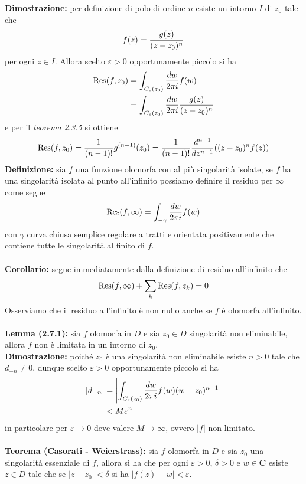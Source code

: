 \documentclass{article}
\begin{document}
\textbf{Dimostrazione:} per definizione di polo di ordine $n$ esiste un intorno $I$ di $z_0$ tale che
\begin{gather}
    f(z) = \frac{g(z)}{(z - z_0)^n} \notag
\end{gather}
per ogni $z \in I$. Allora scelto $\varepsilon > 0$ opportunamente piccolo si ha
\begin{align}
    \mathrm{Res}(f, z_0) &= \int_{C_\varepsilon(z_0)}\frac{dw}{2\pi i}f(w) \notag \\
    &= \int_{C_\varepsilon(z_0)}\frac{dw}{2\pi i}\frac{g(z)}{(z - z_0)^n} \notag
\end{align}
e per il \textit{teorema 2.3.5} si ottiene
\begin{gather}
    \mathrm{Res}(f, z_0) = \frac{1}{(n - 1)!}g^{(n - 1)}(z_0) = \frac{1}{(n - 1)!}\frac{d^{n - 1}}{dz^{n - 1}}((z - z_0)^nf(z)) \notag
\end{gather}
\textbf{Definizione:} sia $f$ una funzione olomorfa con al più singolarità isolate, se $f$ ha una singolarità isolata al punto all'infinito possiamo definire il residuo per $\infty$ come segue
\begin{gather}
    \mathrm{Res}(f, \infty) = \int_{-\gamma}\frac{dw}{2\pi i}f(w) \notag
\end{gather}
con $\gamma$ curva chiusa semplice regolare a tratti e orientata positivamente che contiene tutte le singolarità al finito di $f$. \\ \\
\textbf{Corollario:} segue immediatamente dalla definizione di residuo all'infinito che
\begin{gather}
    \mathrm{Res}(f, \infty) + \sum_k\mathrm{Res}(f, z_k) = 0 \notag
\end{gather}
Osserviamo che il residuo all'infinito è non nullo anche se $f$ è olomorfa all'infinito. \\ \\
\textbf{Lemma (2.7.1):} sia $f$ olomorfa in $D$ e sia $z_0 \in D$ singolarità non eliminabile, allora $f$ non è limitata in un intorno di $z_0$. \\

\textbf{Dimostrazione:} poiché $z_0$ è una singolarità non eliminabile esiste $n > 0$ tale che $d_{-n} \neq 0$, dunque scelto $\varepsilon > 0$ opportunamente piccolo si ha
\begin{align}
    |d_{-n}| &= \left|\int_{C_\varepsilon(z_0)}\frac{dw}{2\pi i}f(w)(w - z_0)^{n - 1}\right| \notag \\
    &< M\varepsilon^n \notag
\end{align}
in particolare per $\varepsilon \rightarrow 0$ deve valere $M \rightarrow \infty$, ovvero $|f|$ non limitato. \\ \\
\textbf{Teorema (Casorati - Weierstrass):} sia $f$ olomorfa in $D$ e sia $z_0$ una singolarità essenziale di $f$, allora si ha che per ogni $\varepsilon > 0$, $\delta > 0$ e $w \in \mathbf{C}$ esiste $z \in D$ tale che se $|z - z_0| < \delta$ si ha $|f(z) - w| < \varepsilon$. \\
\end{document}
